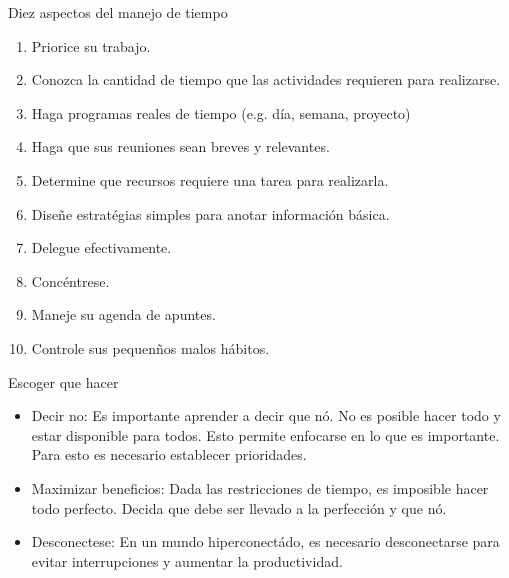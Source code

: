 \documentclass[
10pt,
aspectratio=169,
]{beamer}
\begin{document}
\begin{frame}[c]{Diez aspectos del manejo de tiempo}
\begin{enumerate}
\item Priorice su trabajo.
\item Conozca la cantidad de tiempo que las actividades requieren para realizarse.
\item Haga programas reales de tiempo (e.g. d\'ia, semana, proyecto)
\item Haga que sus reuniones sean breves y relevantes.
\item Determine que recursos requiere una tarea para realizarla.
\item Dise\~ne estrat\'egias simples para anotar informaci\'on b\'asica.
\item Delegue efectivamente.
\item Concéntrese.
\item Maneje su agenda de apuntes.
\item Controle sus pequen\~nos malos h\'abitos. 
\end{enumerate}
\end{frame}

\begin{frame}[c]{Escoger que hacer}
\begin{itemize}
\item \alert{Decir no}: Es importante aprender a decir que n\'o. No es posible hacer todo y estar disponible para todos. Esto permite enfocarse en lo que es importante. Para esto es necesario establecer prioridades.
\item \alert{Maximizar beneficios}: Dada las restricciones de tiempo, es imposible hacer todo perfecto. Decida que debe ser llevado a la perfecci\'on y que n\'o. 
\item \alert{Desconectese}: En un mundo hiperconect\'ado, es necesario desconectarse para evitar interrupciones y aumentar la productividad.
\end{itemize}
\end{frame}
\end{document}

